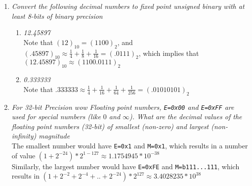\documentclass[12pt]{article}
\begin{document}
\begin{enumerate}
\vspace{7mm}
\item \textit{Convert the following decimal numbers to fixed point unsigned binary with at least 8-bits of binary precision}
  \begin{enumerate}
      \item \textit{12.45897} \\
          Note that $(12)_{10} = (1100)_2$, and $(.45897)_{10} \approx \frac{1}{4} + \frac{1}{8} + \frac{1}{16} = (.0111)_2$, which implies that $(12.45897)_{10} \approx \boxed{(1100.0111)_2}$
      \item \textit{0.333333} \\
          Note that $.333333 \approx \frac{1}{4} + \frac{1}{16} + \frac{1}{64} +\frac{1}{256} = \boxed{(.01010101)_2}$
  \end{enumerate}

\newpage
\item \textit{For 32-bit Precision wow Floating point numbers, {\tt E=0x00} and {\tt E=0xFF} are used for special numbers (like $0$ and $\infty$). What are the decimal values of the floating point numbers (32-bit) of smallest (non-zero) and largest (non-infinity) magnitude} \\

The smallest number would have {\tt E=0x1} and {\tt M=0x1}, which results in a number of value $(1 + 2^{-24}) * 2^{1-127} \approx \boxed{1.1754945 * 10^{-38}}$ \\

Similarly, the largest number would have {\tt E=0xFE} and {\tt M=b111...111}, which results in $(1 + 2^{-2} + 2^{-4} + .. + 2^{-24}) * 2^{127} \approx \boxed{3.4028235 * 10^{38}}$

\end{enumerate}
\end{document}
